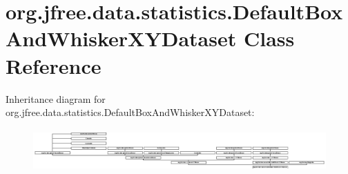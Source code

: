 \hypertarget{classorg_1_1jfree_1_1data_1_1statistics_1_1_default_box_and_whisker_x_y_dataset}{}\section{org.\+jfree.\+data.\+statistics.\+Default\+Box\+And\+Whisker\+X\+Y\+Dataset Class Reference}
\label{classorg_1_1jfree_1_1data_1_1statistics_1_1_default_box_and_whisker_x_y_dataset}
Inheritance diagram for org.\+jfree.\+data.\+statistics.\+Default\+Box\+And\+Whisker\+X\+Y\+Dataset\+:\begin{figure}[H]
\begin{center}
\leavevmode
\includegraphics[height=1.642229cm]{classorg_1_1jfree_1_1data_1_1statistics_1_1_default_box_and_whisker_x_y_dataset}
\end{center}
\end{figure}
